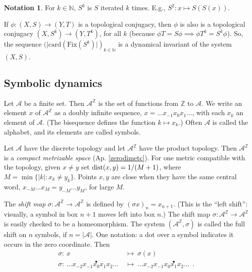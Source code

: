 \documentclass{amsart}
\theoremstyle{definition}
\newtheorem{nota}[equation]{Notation}
\theoremstyle{definition}
\newcommand{\apr}{(Ap. \ref}
\newcommand{\dist}{\textnormal{dist}}
\newcommand{\Z}{\mathbb Z}
\newcommand{\N}{\mathbb N}
\numberwithin{equation}{subsection}
\begin{document}
\begin{nota}For $k\in \N$,  $S^k$ is $S$ iterated $k$ times.
     E.g., $S^2: x\mapsto S(S(x))$.
\end{nota}

If $\phi :(X,S) \to (Y,T)$ is a topological conjugacy, then
$\phi $ is also  is a topological conjugacy $(X,S^k) \to (Y,T^k)$, for all $k$
(because $\phi T= S\phi  \implies \phi T^k =  S^k\phi$).
So, the sequence
     $(|\text{card}(\text{Fix}(S^k)|)_{k\in \N}  $ is a dynamical invariant
     of the system $(X,S)$.

     \subsection{Symbolic dynamics}\label{subsec:symbolicdynamics}

Let $\mathcal A$ be a finite set.
Then $\mathbf{\mathcal A^{\mathbf{\Z}}}$ is the set of functions
     from $\Z$ to $\mathcal A$. We write an element $x$ of $\mathcal A^{\Z}$
     as  a doubly infinite sequence,  $x= \dots x_{-1}x_0x_1\dots$, with each
     $x_k$ an
 element of $\mathcal A$.
 (The bisequence defines the
 function $k\mapsto x_k$.) Often  $\mathcal A$ is called the alphabet, and its elements
 are called symbols.

     Let $\mathcal A$ have the discrete topology and let $\mathcal A^{\Z}$ have the product
     topology. Then $\mathcal A^{\Z}$ is a
{\it compact metrizable
space} \apr{zerodimetc}). For one metric compatible with
     the topology, given $x\neq y$ set
     $\dist (x,y) = 1/(M+1)$, where
     $M = \min \{|k|: x_k \neq y_k\}$. Points $x,y$ are
     close when they have the same central word,
     $x_{-M}\dots x_M = y_{-M}\dots y_M$, for large $M$.

The   {\it shift map} $\sigma: \mathcal A^{\Z}
   \to \mathcal A^{\Z}$ is defined by
     $(\sigma x)_n = x_{n+1}$.
     (This is the ``left shift'': visually, a symbol in box $n+1$ moves left into box $n$.)
     The  shift map $\sigma: \mathcal A^{\Z} \to \mathcal A^{\Z}$ is
     easily checked to be a homeomorphism.
     The system $(\mathcal A^{\Z}, \sigma )$ is called the
     full shift on $n$ symbols, if $n= |\mathcal A| $.
One notation: a dot over a symbol indicates it occurs in the zero coordinate.
Then
\begin{align*}
  \sigma: \ x &\mapsto\  \sigma(x) \\
\sigma :\ \dots x_{-2}x_{-1}\overset{\bullet}{x_0}x_1x_2\dots \ &\mapsto\
\dots x_{-2}x_{-1}x_0\overset{\bullet}{x_1}x_2\dots \ \ .
\end{align*}
\end{document}
